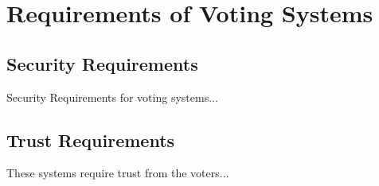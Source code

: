 
\chapter{Requirements of Voting Systems}
\label{ch:req}

\section{Security Requirements}
\label{ch:req:sec}

Security Requirements for voting systems...

\section{Trust Requirements}
\label{ch:req:trust}

These systems require trust from the voters...
